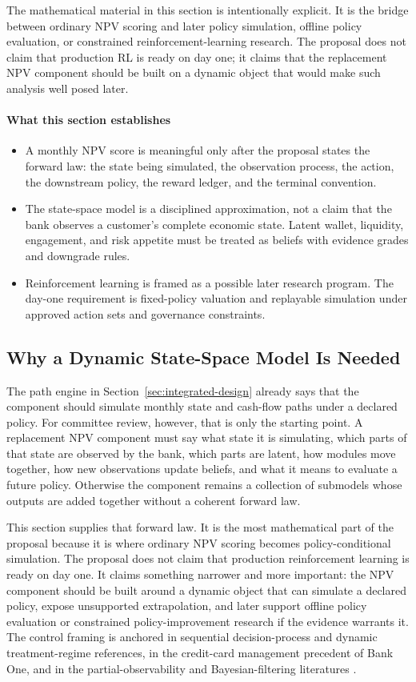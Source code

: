 \documentclass[11pt]{article}
\newcommand{\1}{\mathbf{1}}
\newcommand{\readerbox}[2]{\paragraph{#1}\begin{itemize}[leftmargin=1.5em,itemsep=0.1em,topsep=0.15em]#2\end{itemize}}
\begin{document}
The mathematical material in this section is intentionally explicit.  It is the
bridge between ordinary NPV scoring and later policy simulation, offline policy
evaluation, or constrained reinforcement-learning research.  The proposal does
not claim that production RL is ready on day one; it claims that the replacement
NPV component should be built on a dynamic object that would make such analysis
well posed later.

\readerbox{What this section establishes}{
  \item A monthly NPV score is meaningful only after the proposal states the
        forward law: the state being simulated, the observation process, the
        action, the downstream policy, the reward ledger, and the terminal
        convention.
  \item The state-space model is a disciplined approximation, not a claim that
        the bank observes a customer's complete economic state. Latent wallet,
        liquidity, engagement, and risk appetite must be treated as beliefs
        with evidence grades and downgrade rules.
  \item Reinforcement learning is framed as a possible later research program.
        The day-one requirement is fixed-policy valuation and replayable
        simulation under approved action sets and governance constraints.
}

\subsection{Why a Dynamic State-Space Model Is Needed}
\label{sec:state-space-assembly}

The path engine in Section~\ref{sec:integrated-design} already says that the
component should simulate monthly state and cash-flow paths under a declared
policy. For committee review, however, that is only the starting point. A
replacement NPV component must say what state it is simulating, which parts of
that state are observed by the bank, which parts are latent, how modules move
together, how new observations update beliefs, and what it means to evaluate a
future policy. Otherwise the component remains a collection of submodels whose
outputs are added together without a coherent forward law.

This section supplies that forward law. It is the most mathematical part of the
proposal because it is where ordinary NPV scoring becomes policy-conditional
simulation. The proposal does not claim that production reinforcement learning
is ready on day one. It claims something narrower and more important: the NPV
component should be built around a dynamic object that can simulate a declared
policy, expose unsupported extrapolation, and later support offline policy
evaluation or constrained policy-improvement research if the evidence warrants
it. The control framing is anchored in sequential decision-process and dynamic
treatment-regime references, in the credit-card management precedent of Bank
One, and in the partial-observability and Bayesian-filtering literatures
\citep{puterman1994mdp,murphy2003dynamic,trench2003bankone,
thomas2011creditcardmdp,smallwood1973pomdp,kaelbling1998pomdp,durbinkoopman2012ssm,
westharrison1997bfdm,doucet2001smc}.
\end{document}
